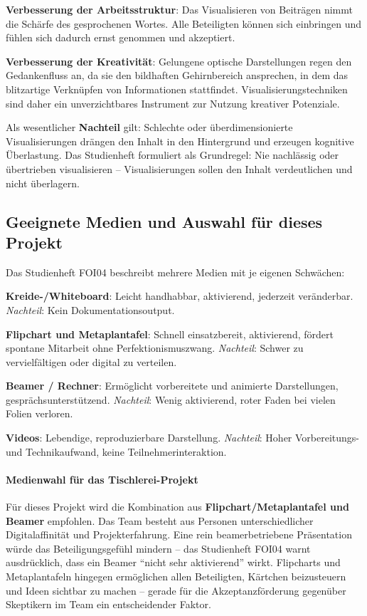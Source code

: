 \documentclass[
    a4paper,
    11pt,
    bibliography=totoc,
    listof=totoc,
    parskip=half,
    headings=normal
]{scrbook}
\begin{document}
\textbf{Verbesserung der Arbeitsstruktur}: Das Visualisieren von Beiträgen nimmt
die Schärfe des gesprochenen Wortes. Alle Beteiligten können sich einbringen und fühlen sich dadurch
ernst genommen und akzeptiert.

\textbf{Verbesserung der Kreativität}: Gelungene optische Darstellungen regen den
Gedankenfluss an, da sie den bildhaften Gehirnbereich ansprechen, in dem das
blitzartige Verknüpfen von Informationen stattfindet. Visualisierungstechniken
sind daher ein unverzichtbares Instrument zur Nutzung kreativer Potenziale\autocite[vgl.][Kap.~2]{Kiefer2010}.

Als wesentlicher \textbf{Nachteil} gilt: Schlechte oder überdimensionierte
Visualisierungen drängen den Inhalt in den Hintergrund und erzeugen kognitive
Überlastung. Das Studienheft formuliert als Grundregel: Nie nachlässig oder
übertrieben visualisieren -- Visualisierungen sollen den Inhalt verdeutlichen
und nicht überlagern\autocite[vgl.][Kap.~2]{Kiefer2010}.

\subsection{Geeignete Medien und Auswahl für dieses Projekt}

Das Studienheft FOI04 beschreibt mehrere Medien mit je eigenen Schwächen\autocite[vgl.][Kap.~2]{Kiefer2010}:

\textbf{Kreide-/Whiteboard}: Leicht handhabbar, aktivierend, jederzeit
veränderbar. \textit{Nachteil}: Kein Dokumentationsoutput.

\textbf{Flipchart und Metaplantafel}: Schnell einsatzbereit, aktivierend, fördert
spontane Mitarbeit ohne Perfektionismuszwang. \textit{Nachteil}: Schwer zu
vervielfältigen oder digital zu verteilen.

\textbf{Beamer / Rechner}: Ermöglicht vorbereitete und animierte Darstellungen,
gesprächsunterstützend. \textit{Nachteil}: Wenig aktivierend, roter Faden bei
vielen Folien verloren.

\textbf{Videos}: Lebendige, reproduzierbare Darstellung.
\textit{Nachteil}: Hoher Vorbereitungs- und Technikaufwand, keine
Teilnehmerinteraktion.

\paragraph{Medienwahl für das Tischlerei-Projekt}

Für dieses Projekt wird die Kombination aus \textbf{Flipchart/Metaplantafel und
      Beamer} empfohlen. Das Team besteht aus Personen unterschiedlicher
Digitalaffinität und Projekterfahrung. Eine rein beamerbetriebene Präsentation
würde das Beteiligungsgefühl mindern -- das Studienheft FOI04 warnt
ausdrücklich, dass ein Beamer \enquote{nicht sehr aktivierend} wirkt\autocite[vgl.][Kap.~2]{Kiefer2010}. Flipcharts und Metaplantafeln hingegen
ermöglichen allen Beteiligten, Kärtchen beizusteuern und Ideen sichtbar zu
machen -- gerade für die Akzeptanzförderung gegenüber Skeptikern im Team ein
entscheidender Faktor.
\end{document}
